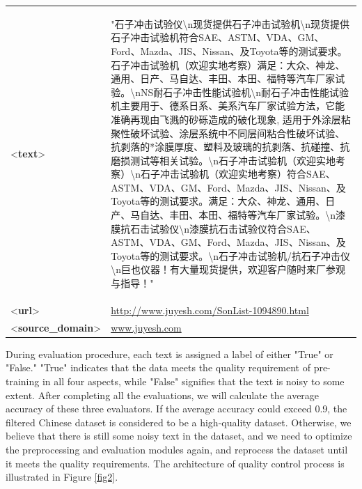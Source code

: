\documentclass{article}
\begin{document}
\begin{table}[htbp]
\begin{tabular}{p{2.5cm} p{12cm} }
        <\textbf{text}> & \multicolumn{1}{m{12cm}}{\begin{CJK}{UTF8}{gbsn} "石子冲击试验仪\textbackslash n现货提供石子冲击试验机\textbackslash n现货提供石子冲击试验机符合SAE、ASTM、VDA、GM、Ford、Mazda、JIS、Nissan、及Toyota等的测试要求。石子冲击试验机（欢迎实地考察）满足：大众、神龙、通用、日产、马自达、丰田、本田、福特等汽车厂家试验。\textbackslash nNS耐石子冲击性能试验机\textbackslash n耐石子冲击性能试验机主要用于、德系日系、美系汽车厂家试验方法，它能准确再现由飞溅的砂砾造成的破化现象, 适用于外涂层粘聚性破坏试验、涂层系统中不同层间粘合性破坏试验、抗剥落的*涂膜厚度、塑料及玻璃的抗剥落、抗碰撞、抗磨损测试等相关试验。\textbackslash n石子冲击试验机（欢迎实地考察）\textbackslash n石子冲击试验机（欢迎实地考察）符合SAE、ASTM、VDA、GM、Ford、Mazda、JIS、Nissan、及Toyota等的测试要求。满足：大众、神龙、通用、日产、马自达、丰田、本田、福特等汽车厂家试验。\textbackslash n漆膜抗石击试验仪\textbackslash n漆膜抗石击试验仪符合SAE、ASTM、VDA、GM、Ford、Mazda、JIS、Nissan、及Toyota等的测试要求。\textbackslash n石子冲击试验机/抗石子冲击仪\textbackslash n巨也仪器！有大量现货提供，欢迎客户随时来厂参观与指导！" \end{CJK}}  \\
        <\textbf{url}> & \url{http://www.juyesh.com/SonList-1094890.html}\\
        <\textbf{source\_domain}> & \url{www.juyesh.com}\\
        \bottomrule
    \end{tabular}
\end{table} 
 
 
 During evaluation procedure, each text is assigned a label of either "True" or "False." "True" indicates that the data meets the quality requirement of pre-training in all four aspects, while "False" signifies that the text is noisy to some extent. After completing all the evaluations, we will calculate the average accuracy of these three evaluators. If the average accuracy could exceed 0.9, the filtered Chinese dataset is considered to be a high-quality dataset. Otherwise, we believe that there is still some noisy text in the dataset, and we need to optimize the preprocessing and evaluation modules again, and reprocess the dataset until it meets the quality requirements. The architecture of quality control process is illustrated in Figure \ref{fig2}. 
 
 
 
\end{document}

